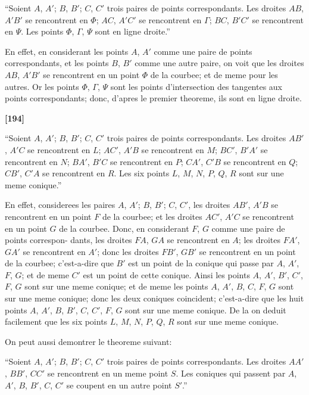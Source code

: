 \documentclass[11pt,a4paper]{article}
\begin{document}
``Soient $A$, $A'$; $B$, $B'$; $C$, $C'$ trois paires de points correspondants. Les droites
$AB$, $A'B'$ se rencontrent en $\Phi$; $AC$, $A'C'$ se rencontrent en $\Gamma$; $BC$, $B'C'$ se rencontrent en $\Psi$.
Les points $\Phi$, $\Gamma$, $\Psi$ sont en ligne droite.''

En effet, en considerant les points $A$, $A'$ comme une paire de points correspondants,
et les points $B$, $B'$ comme une autre paire, on voit que les droites $AB$, $A'B'$ se
rencontrent en un point $\Phi$ de la courbee; et de meme pour les autres. Or les points
$\Phi$, $\Gamma$, $\Psi$ sont les points d'intersection des tangentes aux points correspondants; donc,
d'apres le premier theoreme, ils sont en ligne droite.

\textbf{[194]}

``Soient $A$, $A'$; $B$, $B'$; $C$, $C'$ trois paires de points correspondants. Les droites
$AB'$, $A'C$ se rencontrent en $L$; $AC'$, $A'B$ se rencontrent en $M$; $BC'$, $B'A'$ se rencontrent
en $N$; $BA'$, $B'C$ se rencontrent en $P$; $CA'$, $C'B$ se rencontrent en $Q$; $CB'$, $C'A$ se
rencontrent en $R$. Les six points $L$, $M$, $N$, $P$, $Q$, $R$ sont sur une meme conique.''

En effet, considerees les paires $A$, $A'$; $B$, $B'$; $C$, $C'$, les droites $AB'$, $A'B$ se
rencontrent en un point $F$ de la courbee; et les droites $AC'$, $A'C$ se rencontrent en un
point $G$ de la courbee. Donc, en considerant $F$, $G$ comme une paire de points correspon-
dants, les droites $FA$, $GA$ se rencontrent en $A$; les droites $FA'$, $GA'$ se rencontrent en
$A'$; donc les droites $FB'$, $GB'$ se rencontrent en un point de la courbee; c'est-a-dire
que $B'$ est un point de la conique qui passe par $A$, $A'$, $F$, $G$; et de meme $C'$ est un
point de cette conique. Ainsi les points $A$, $A'$, $B'$, $C'$, $F$, $G$ sont sur une meme conique;
et de meme les points $A$, $A'$, $B$, $C$, $F$, $G$ sont sur une meme conique; donc les deux
coniques coincident; c'est-a-dire que les huit points $A$, $A'$, $B$, $B'$, $C$, $C'$, $F$, $G$ sont
sur une meme conique. De la on deduit facilement que les six points $L$, $M$, $N$, $P$, $Q$, $R$
 sont sur une meme conique.

On peut aussi demontrer le theoreme suivant:

``Soient $A$, $A'$; $B$, $B'$; $C$, $C'$ trois paires de points correspondants. Les droites
$AA'$, $BB'$, $CC'$ se rencontrent en un meme point $S$. Les coniques qui passent par
$A$, $A'$, $B$, $B'$, $C$, $C'$ se coupent en un autre point $S'$.''
\end{document}
